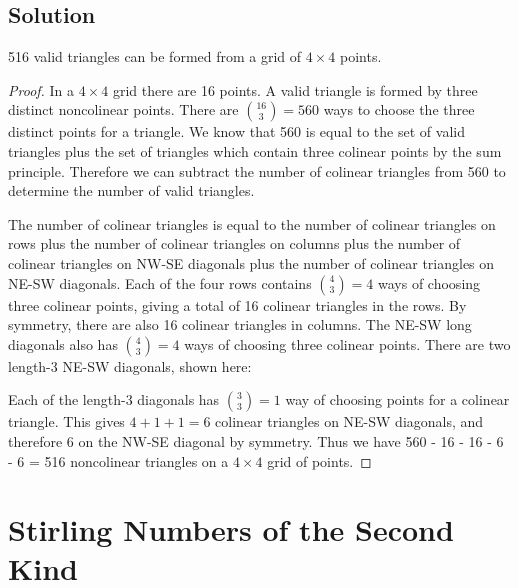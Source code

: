 \documentclass[12pt]{article}
\begin{document}
\subsection*{Solution}
516 valid triangles can be formed from a grid of $4 \times 4$ points. 
\begin{proof}
    

In a $4 \times 4$ grid there are 16 points. A valid triangle is formed by three distinct noncolinear points. There are $\binom{16}{3} = 560$ ways to choose the three distinct points for a triangle. We know that 560 is equal to the set of valid triangles plus the set of triangles which contain three colinear points by the sum principle. Therefore we can subtract the number of colinear triangles from 560 to determine the number of valid triangles.

    The number of colinear triangles is equal to the number of colinear triangles on rows plus the number of colinear triangles on columns plus the number of colinear triangles on NW-SE diagonals plus the number of colinear triangles on NE-SW diagonals. 
    Each of the four rows contains $\binom{4}{3} = 4$ ways of choosing three colinear points, giving a total of 16 colinear triangles in the rows. By symmetry, there are also 16 colinear triangles in columns. The NE-SW long diagonals also has $\binom{4}{3} = 4$ ways of choosing three colinear points. There are two length-3 NE-SW diagonals, shown here: 

\begin{center}
\end{center}

Each of the length-3 diagonals has $\binom{3}{3} = 1$ way of choosing points for a colinear triangle. This gives $4+1+1 = 6$ colinear triangles on NE-SW diagonals, and therefore 6 on the NW-SE diagonal by symmetry. Thus we have 560 - 16 - 16 - 6 - 6 = 516 noncolinear triangles on a $4 \times 4$ grid of points. 
\end{proof}

\section{Stirling Numbers of the Second Kind}
\end{document}
